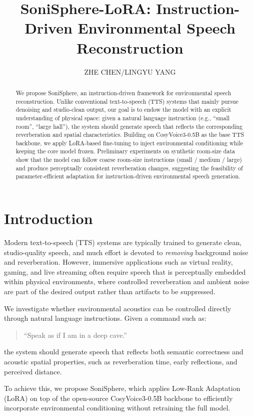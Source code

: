 \documentclass{article}
\title{SoniSphere-LoRA: Instruction-Driven Environmental Speech Reconstruction}
\author{ZHE CHEN/LINGYU YANG}
\begin{document}
\maketitle
\begin{abstract}
We propose SoniSphere, an instruction-driven framework for environmental speech reconstruction. Unlike conventional text-to-speech (TTS) systems that mainly pursue denoising and studio-clean output, our goal is to endow the model with an explicit understanding of physical space: given a natural language instruction (e.g., ``small room'', ``large hall''), the system should generate speech that reflects the corresponding reverberation and spatial characteristics. Building on CosyVoice3-0.5B as the base TTS backbone, we apply LoRA-based fine-tuning to inject environmental conditioning while keeping the core model frozen. Preliminary experiments on synthetic room-size data show that the model can follow coarse room-size instructions (small / medium / large) and produce perceptually consistent reverberation changes, suggesting the feasibility of parameter-efficient adaptation for instruction-driven environmental speech generation.
\end{abstract}

\section{Introduction}

Modern text-to-speech (TTS) systems are typically trained to generate clean, studio-quality speech, and much effort is devoted to \emph{removing} background noise and reverberation. However, immersive applications such as virtual reality, gaming, and live streaming often require speech that is perceptually embedded within physical environments, where controlled reverberation and ambient noise are part of the desired output rather than artifacts to be suppressed.

We investigate whether environmental acoustics can be controlled directly through natural language instructions. Given a command such as:

\begin{quote}
``Speak as if I am in a deep cave.''
\end{quote}

the system should generate speech that reflects both semantic correctness and acoustic spatial properties, such as reverberation time, early reflections, and perceived distance.

To achieve this, we propose SoniSphere, which applies Low-Rank Adaptation (LoRA) on top of the open-source CosyVoice3-0.5B backbone to efficiently incorporate environmental conditioning without retraining the full model.
\end{document}
